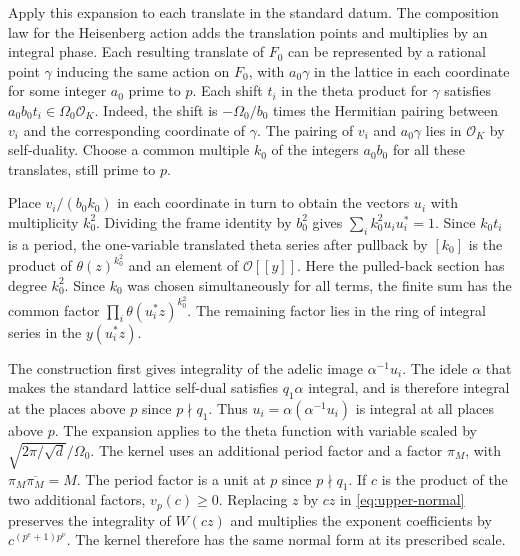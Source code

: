 Apply this expansion to each translate in the standard datum.
The composition law for the Heisenberg action adds the translation
points and multiplies by an integral phase.
Each resulting translate of \(F_0\) can be represented by a
rational point \(\gamma\) inducing the same action on \(F_0\),
with \(a_0\gamma\) in the lattice in each coordinate for some
integer \(a_0\) prime to \(p\).
Each shift \(t_i\) in the theta product for \(\gamma\) satisfies
\(a_0 b_0 t_i\in\Omega_0\mathcal O_K\).
Indeed, the shift is \(-\Omega_0/b_0\) times the Hermitian pairing
between \(v_i\) and the corresponding coordinate of \(\gamma\).
The pairing of \(v_i\) and \(a_0\gamma\) lies in \(\mathcal O_K\)
by self-duality. Choose a common multiple \(k_0\) of the integers
\(a_0 b_0\) for all these translates, still prime to \(p\).

Place \(v_i/(b_0 k_0)\) in each coordinate in turn to obtain
the vectors \(u_i\) with multiplicity \(k_0^2\). Dividing the
frame identity by \(b_0^2\) gives \(\sum_i k_0^2u_i u_i^\ast=1\).
Since \(k_0 t_i\) is a period, the one-variable translated theta
series after pullback by \([k_0]\) is the product of \(\theta(z)^{k_0^2}\)
and an element of \(\mathcal O[[y]]\). Here the pulled-back
section has degree \(k_0^2\).
Since \(k_0\) was chosen simultaneously for all terms, the finite sum
has the common factor \(\prod_i\theta(u_i^\ast z)^{k_0^2}\).
The remaining factor lies in the ring of integral series in the
\(y(u_i^\ast z)\).

The construction first gives integrality of the adelic image
\(\alpha^{-1}u_i\). The idele \(\alpha\) that makes the standard
lattice self-dual satisfies \(q_1\alpha\) integral, and is therefore
integral at the places above \(p\) since \(p\nmid q_1\).
Thus \(u_i=\alpha(\alpha^{-1}u_i)\) is integral at all places above \(p\).
The expansion applies to the theta function with variable scaled by
\(\sqrt{2\pi/\sqrt d}/\Omega_0\). The kernel uses an additional
period factor and a factor \(\pi_M\), with \(\pi_M\overline{\pi_M}=M\).
The period factor is a unit at \(p\) since \(p\nmid q_1\).
If \(c\) is the product of the two additional factors, \(v_p(c)\ge0\).
Replacing \(z\) by \(cz\) in \eqref{eq:upper-normal} preserves the
integrality of \(W(cz)\) and multiplies the exponent coefficients by
\(c^{(p^e+1)p^\nu}\). The kernel therefore has the same normal form
at its prescribed scale.

